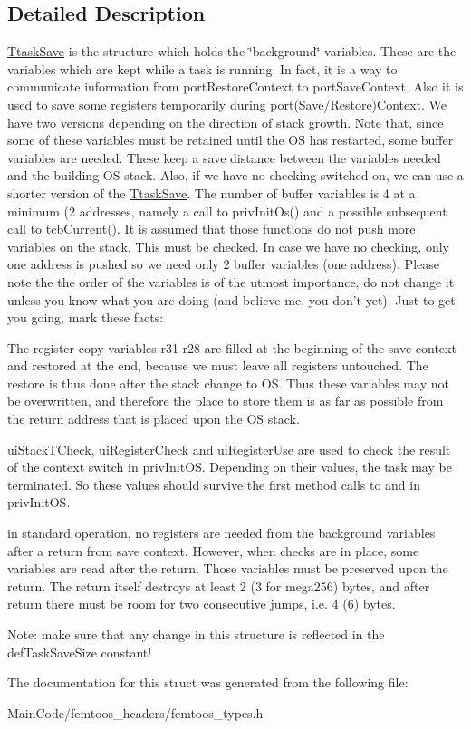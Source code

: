 \subsection{Detailed Description}
\hyperlink{struct_ttask_save}{Ttask\-Save} is the structure which holds the \char`\"{}background\char`\"{} variables. These are the variables which are kept while a task is running. In fact, it is a way to communicate information from port\-Restore\-Context to port\-Save\-Context. Also it is used to save some registers temporarily during port(Save/\-Restore)Context. We have two versions depending on the direction of stack growth. Note that, since some of these variables must be retained until the O\-S has restarted, some buffer variables are needed. These keep a save distance between the variables needed and the building O\-S stack. Also, if we have no checking switched on, we can use a shorter version of the \hyperlink{struct_ttask_save}{Ttask\-Save}. The number of buffer variables is 4 at a minimum (2 addresses, namely a call to priv\-Init\-Os() and a possible subsequent call to tcb\-Current(). It is assumed that those functions do not push more variables on the stack. This must be checked. In case we have no checking, only one address is pushed so we need only 2 buffer variables (one address). Please note the the order of the variables is of the utmost importance, do not change it unless you know what you are doing (and believe me, you don't yet). Just to get you going, mark these facts\-:
\begin{DoxyItemize}
\item The register-\/copy variables r31-\/r28 are filled at the beginning of the save context and restored at the end, because we must leave all registers untouched. The restore is thus done after the stack change to O\-S. Thus these variables may not be overwritten, and therefore the place to store them is as far as possible from the return address that is placed upon the O\-S stack.
\item ui\-Stack\-T\-Check, ui\-Register\-Check and ui\-Register\-Use are used to check the result of the context switch in priv\-Init\-O\-S. Depending on their values, the task may be terminated. So these values should survive the first method calls to and in priv\-Init\-O\-S.
\item in standard operation, no registers are needed from the background variables after a return from save context. However, when checks are in place, some variables are read after the return. Those variables must be preserved upon the return. The return itself destroys at least 2 (3 for mega256) bytes, and after return there must be room for two consecutive jumps, i.\-e. 4 (6) bytes.

Note\-: make sure that any change in this structure is reflected in the def\-Task\-Save\-Size constant! 
\end{DoxyItemize}

The documentation for this struct was generated from the following file\-:\begin{DoxyCompactItemize}
\item 
Main\-Code/femtoos\-\_\-headers/femtoos\-\_\-types.\-h\end{DoxyCompactItemize}
